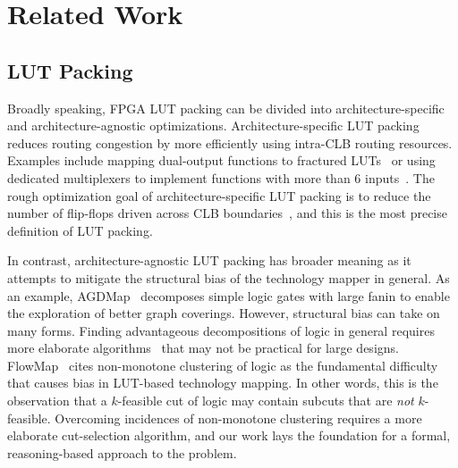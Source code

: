 \section{Related Work}\label{sec:relatedwork}
\subsection{LUT Packing}\label{sec:relatedwork:fpga}
Broadly speaking, FPGA LUT packing can be divided into architecture-specific
and architecture-agnostic optimizations. Architecture-specific LUT packing
reduces routing congestion by more efficiently using intra-CLB routing
resources. Examples include mapping dual-output functions to fractured
LUTs~\cite{fraclut} or using dedicated multiplexers to implement functions with
more than 6 inputs~\cite{ug574}. The rough optimization goal of
architecture-specific LUT packing is to reduce the number of flip-flops driven
across CLB boundaries~\cite{ffpack}, and this is the most precise definition of
LUT packing.

In contrast, architecture-agnostic LUT packing has broader meaning as it
attempts to mitigate the structural bias of the technology mapper in general.
As an example, AGDMap~\cite{adaptdecomp} decomposes simple logic gates with
large fanin to enable the exploration of better graph coverings. However,
structural bias can take on many forms. Finding advantageous decompositions of
logic in general requires more elaborate algorithms~\cite{dsd} that may not be
practical for large designs. FlowMap~\cite{flowmap} cites non-monotone
clustering of logic as the fundamental difficulty that causes bias in LUT-based
technology mapping. In other words, this is the observation that a $k$-feasible
cut of logic may contain subcuts that are \textit{not} $k$-feasible. Overcoming
incidences of non-monotone clustering requires a more elaborate cut-selection
algorithm, and our work lays the foundation for a formal, reasoning-based
approach to the problem.

